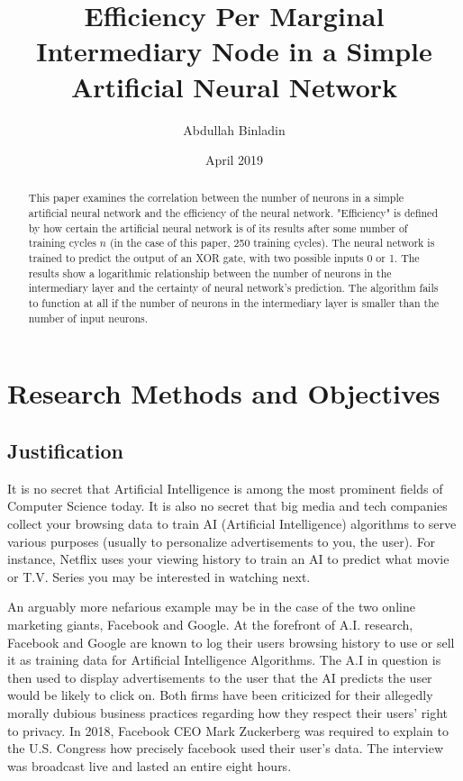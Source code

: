 \documentclass[12pt]{article}
\title{Efficiency Per Marginal Intermediary Node in a Simple Artificial Neural Network}
\author{Abdullah Binladin}
\date{April 2019}
\begin{document}
\maketitle

\begin{abstract}
This paper examines the correlation between the number of neurons in a simple artificial neural network and the efficiency of the neural network. "Efficiency" is defined by how certain the artificial neural network is of its results after some number of training cycles \begin{math}n\end{math} (in the case of this paper, 250 training cycles). The neural network is trained to predict the output of an XOR gate, with two possible inputs 0 or 1. The results show a logarithmic relationship between the number of neurons in the intermediary layer and the certainty of neural network's prediction. The algorithm fails to function at all if the number of neurons in the intermediary layer is smaller than the number of input neurons.
\end{abstract}

\tableofcontents
\pagebreak


\section{Research Methods and Objectives}

\subsection{Justification\label{history}}

It is no secret that Artificial Intelligence is among the most prominent fields of Computer Science today. It is also no secret that big media and tech
companies collect your browsing data to train AI (Artificial Intelligence) algorithms to serve various purposes (usually to personalize advertisements to you, the user). For instance, Netflix uses your viewing history to train an AI to predict what movie or T.V. Series you may be interested in watching next.

An arguably more nefarious example may be in the case of the two online marketing giants, Facebook and Google. At the forefront of A.I. research, Facebook and Google are known to log their users browsing history to use or sell it as training data for Artificial Intelligence Algorithms. The A.I in question is then used to display advertisements to the user that the AI predicts the user would be likely to click on. Both firms have been criticized for their allegedly morally dubious business practices regarding how they respect their users' right to privacy. In 2018, Facebook CEO Mark Zuckerberg was required to explain to the U.S. Congress how precisely facebook used their user's data. The interview was broadcast live and lasted an entire eight hours.
\end{document}
